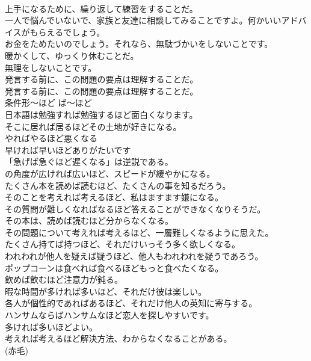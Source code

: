 \documentclass[8pt]{extreport}
\begin{document}
\begin{CJK}{UTF8}{min}
\\	上手になるために、繰り返して練習をすることだ。  
\\	一人で悩んでいないで、家族と友達に相談してみることですよ。何かいいアドバイスがもらえるでしょう。  
\\	お金をためたいのでしょう。それなら、無駄づかいをしないことです。  
\\	暖かくして、ゆっくり休むことだ。   
\\	無理をしないことです。  
\\	発言する前に、この問題の要点は理解することだ。  
\\	発言する前に、この問題の要点は理解することだ。  
\\	条件形〜ほど	ば〜ほど	
\\	日本語は勉強すれば勉強するほど面白くなります。   
\\	そこに居れば居るほどその土地が好きになる。  
\\	やればやるほど悪くなる  
\\	早ければ早いほどありがたいです  
\\	「急げば急ぐほど遅くなる」は逆説である。  
\\	の角度が広ければ広いほど、スピードが緩やかになる。  
\\	たくさん本を読めば読むほど、たくさんの事を知るだろう。  
\\	そのことを考えれば考えるほど、私はますます嫌になる。  
\\	その質問が難しくなればなるほど答えることができなくなりそうだ。  
\\	その本は、読めば読むほど分からなくなる。  
\\	その問題について考えれば考えるほど、一層難しくなるように思えた。  
\\	たくさん持てば持つほど、それだけいっそう多く欲しくなる。  
\\	われわれが他人を疑えば疑うほど、他人もわれわれを疑うであろう。  
\\	ポップコーンは食べれば食べるほどもっと食べたくなる。  
\\	飲めば飲むほど注意力が鈍る。  
\\	暇な時間が多ければ多いほど、それだけ彼は楽しい。  
\\	各人が個性的であればあるほど、それだけ他人の英知に寄与する。  
\\	ハンサムならばハンサムなほど恋人を探しやすいです。  
\\	多ければ多いほどよい。  
\\	考えれば考えるほど解決方法、わからなくなることがある。  
\\	(赤毛)

\end{CJK}
\end{document}
